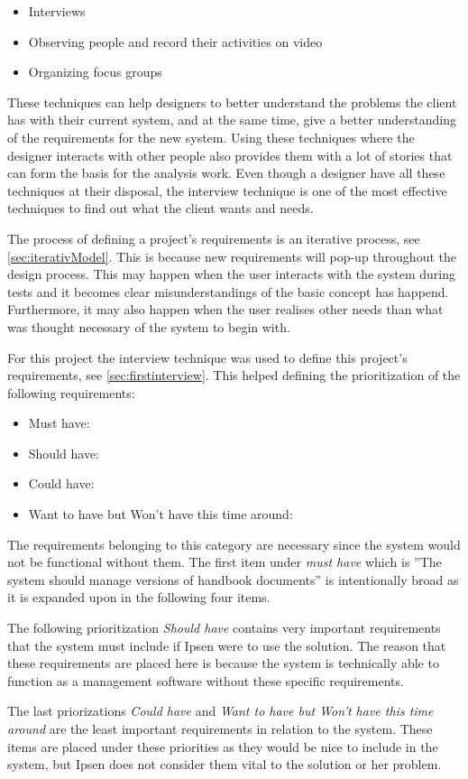\begin{itemize}
    \item Interviews
    \item Observing people and record their activities on video
    \item Organizing focus groups
\end{itemize}

These techniques can help designers to better understand the problems the client has with their current system, and at the same time, give a better understanding of the requirements for the new system.
Using these techniques where the designer interacts with other people also provides them with a lot of stories that can form the basis for the analysis work.
Even though a designer have all these techniques at their disposal, the interview technique
is one of the most effective techniques to find out what the client wants and needs.

The process of defining a project's requirements is an iterative process, see \cref{sec:iterativModel}.
This is because new requirements will pop-up throughout the design process.
This may happen when the user interacts with the system during tests and it becomes clear misunderstandings of the basic concept has happend.
Furthermore, it may also happen when the user realises other needs than what was thought necessary of the system to begin with.

For this project the interview technique was used to define this project's requirements, see \cref{sec:firstinterview}. This helped defining the prioritization of the following requirements:

\begin{itemize}
	\item
		Must have:
		
	\item
		Should have:
		
	\item
		Could have:
		
	\item
		Want to have but Won't have this time around:
		
\end{itemize}

The requirements belonging to this category are necessary since the system would not be functional without them.
The first item under \textit{must have} which is ''The system should manage versions of handbook documents'' is intentionally broad as it is expanded upon in the following four items.

The following prioritization \textit{Should have} contains very important requirements that the system must include if Ipsen were to use the solution.
The reason that these requirements are placed here is because the system is technically able to function as a management software without these specific requirements.

The last priorizations \textit{Could have} and \textit{Want to have but Won't have this time around} are the least important requirements in relation to the system.
These items are placed under these priorities as they would be nice to include in the system, but Ipsen does not consider them vital to the solution or her problem.
